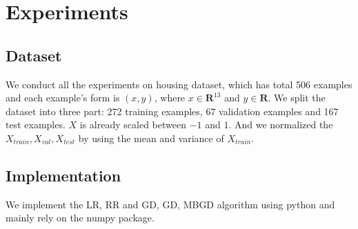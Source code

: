 \documentclass[journal, a4paper]{IEEEtran}
\begin{document}
\section{Experiments}
\subsection{Dataset}
We conduct all the experiments on housing dataset, which has total 506 examples and each example's form is $(x, y)$, where $x \in \mathbf{R}^{13}$ and $y \in \mathbf{R}$. We split the dataset into three part: 272 training examples, 67 validation examples and 167 test examples. $X$ is already scaled between $-1$ and $1$. And we normalized the $X_{train}, X_{val}, X_{test} $ by using the mean and variance of $X_{train}$. 

\subsection{Implementation}
We implement the LR, RR and GD, GD, MBGD algorithm using python and mainly rely on the numpy package.
\end{document}
